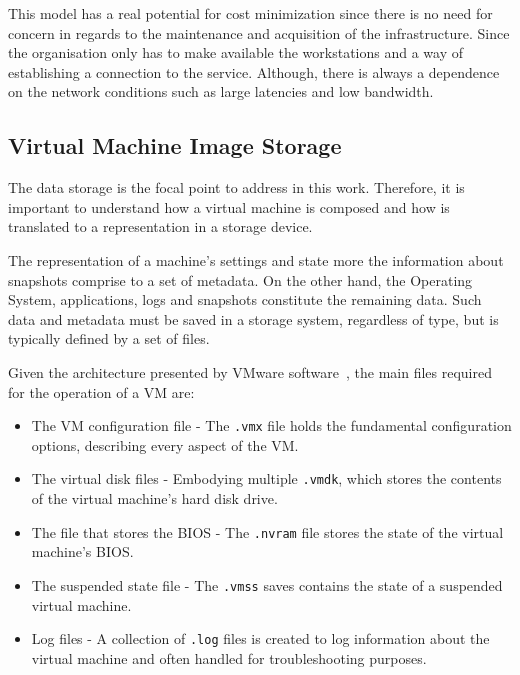 This model has a real potential for cost minimization since there is no need for concern in regards to the maintenance and acquisition of the infrastructure. Since the organisation only has to make available the workstations and a way of establishing a connection to the service. Although, there is always a dependence on the network conditions such as large latencies and low bandwidth.

\nocite{Nuno2016}
\nocite{Eduardo2016}
\nocite{P2020}


\subsection{Virtual Machine Image Storage} %
\label{sub:vm_storage}

The data storage is the focal point to address in this work. Therefore, it is important to understand how a virtual machine is composed and how is translated to a representation in a storage device.

The representation of a machine's settings and state more the information about snapshots comprise to a set of metadata. On the other hand, the Operating System, applications, logs and snapshots constitute the remaining data. Such data and metadata must be saved in a storage system, regardless of type, but is typically defined by a set of files. 

Given the architecture presented by VMware software~\cite{VMWare_VMFiles}, the main files required for the operation of a VM are:

\begin{itemize}
	\item The VM configuration file - The \texttt{.vmx} file holds the fundamental configuration options, describing every aspect of the VM.
	\item The virtual disk files - Embodying multiple \texttt{.vmdk}, which stores the contents of the virtual machine's hard disk drive.
	\item The file that stores the BIOS - The \texttt{.nvram} file stores the state of the virtual machine's BIOS.
	\item The suspended state file - The \texttt{.vmss} saves contains the state of a suspended virtual machine.
	\item Log files - A collection of \texttt{.log} files is created to log information about the virtual machine and often handled for troubleshooting purposes.
\end{itemize}


